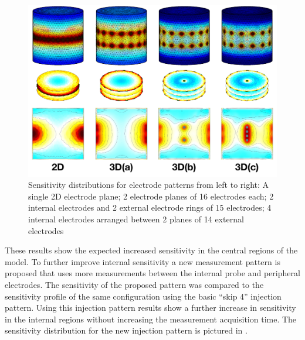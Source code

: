 \begin{figure}
\centering
\includegraphics[width=\textwidth]{chapter6-internal_electrodes/imgs/Sensitivity_Comparison_new.pdf}
\caption[Sensitivity with different internal electrode configurations]{Sensitivity distributions for electrode patterns from left to right: A single 2D electrode plane; 2 electrode planes of 16 electrodes 
each; 2 internal electrodes and 2 external electrode rings of 15 electrodes; 4 internal electrodes arranged between 2 planes of 14 external
electrodes}
\label{fig:internal_sensitivity}
\end{figure}

These results show the expected increased sensitivity in the central regions of the model. 
To further improve internal sensitivity a new
measurement pattern is proposed that uses more measurements between the 
internal probe and peripheral electrodes. 
The sensitivity of the proposed pattern was compared to the sensitivity profile 
of the same configuration using 
the basic ``skip 4'' injection pattern.
Using this injection pattern results show a further increase in sensitivity 
in the internal regions without increasing the measurement
acquisition time. The sensitivity distribution for the new injection pattern 
is pictured in .

